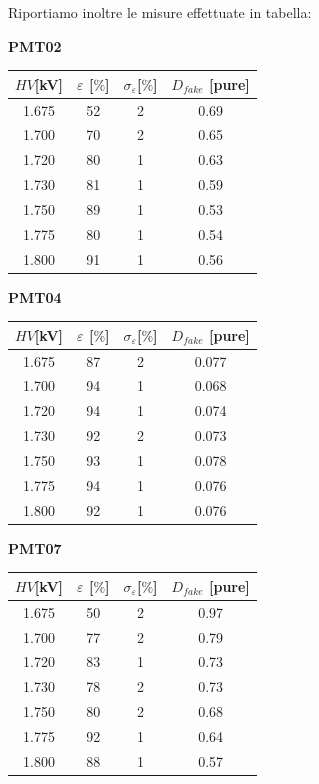 \documentclass[10pt,a4paper]{article}
\begin{document}
Riportiamo inoltre le misure effettuate in tabella:

\newpage

\centering

\textbf{PMT02}

\vspace{0.25cm}

\begin{tabular}{|c|c|c|c|}
\toprule
$HV$[kV]& $\varepsilon$ [$\%$] & $\sigma_{\varepsilon}$[$\%$] & $D_{fake}$ [pure] \\
\midrule
1.675 & 52 & 2 & 0.69 \\
1.700 & 70 & 2 & 0.65 \\
1.720 & 80 & 1 & 0.63 \\
1.730 & 81 & 1 & 0.59 \\
1.750 & 89 & 1 & 0.53 \\
1.775 & 80 & 1 & 0.54 \\
1.800 & 91 & 1 & 0.56 \\
\bottomrule
\end{tabular}

\vspace{1cm}

\textbf{PMT04}

\vspace{0.25cm}

\begin{tabular}{|c|c|c|c|}
\toprule
$HV$[kV]& $\varepsilon$ [$\%$] & $\sigma_{\varepsilon}$[$\%$] & $D_{fake}$ [pure] \\
\midrule
1.675 & 87 & 2 & 0.077 \\
1.700 & 94 & 1 & 0.068 \\
1.720 & 94 & 1 & 0.074 \\
1.730 & 92 & 2 & 0.073 \\
1.750 & 93 & 1 & 0.078 \\
1.775 & 94 & 1 & 0.076 \\
1.800 & 92 & 1 & 0.076 \\
\bottomrule
\end{tabular}

\vspace{1cm}

\textbf{PMT07}

\vspace{0.25cm}

\begin{tabular}{|c|c|c|c|}
\toprule
$HV$[kV]& $\varepsilon$ [$\%$] & $\sigma_{\varepsilon}$[$\%$] & $D_{fake}$ [pure] \\
\midrule
1.675 & 50 & 2 & 0.97 \\
1.700 & 77 & 2 & 0.79 \\
1.720 & 83 & 1 & 0.73 \\
1.730 & 78 & 2 & 0.73 \\
1.750 & 80 & 2 & 0.68 \\
1.775 & 92 & 1 & 0.64 \\
1.800 & 88 & 1 & 0.57 \\
\bottomrule
\end{tabular}
\end{document}
